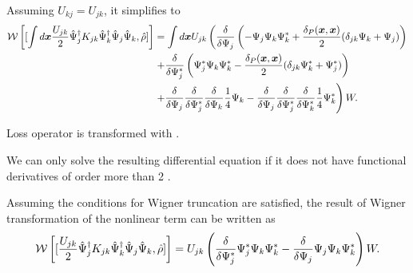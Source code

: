 Assuming $U_{kj} = U_{jk}$, it simplifies to
\begin{equation*}
\begin{split}
	\mathcal{W} \left[
		[
			\int d\boldsymbol{x} \frac{U_{jk}}{2}
				\hat{\Psi}_j^\dagger K_{jk} \hat{\Psi}_k^\dagger \hat{\Psi}_j \hat{\Psi}_k,
			\hat{\rho}
		]
	\right]
	& = \int d\boldsymbol{x} U_{jk} \left(
		\frac{\delta}{\delta \Psi_j} \left(
			- \Psi_j \Psi_k \Psi_k^*
			+ \frac{\delta_P(\boldsymbol{x}, \boldsymbol{x})}{2} ( \delta_{jk} \Psi_k + \Psi_j )
		\right) \right. \\
	&	\left. + \frac{\delta}{\delta \Psi_j^*} \left(
			\Psi_j^* \Psi_k \Psi_k^*
			- \frac{\delta_P(\boldsymbol{x}, \boldsymbol{x})}{2} ( \delta_{jk} \Psi_k^* + \Psi_j^* )
		\right) \right. \\
	&	\left.
			+ \frac{\delta}{\delta \Psi_j}
			\frac{\delta}{\delta \Psi_j^*}
			\frac{\delta}{\delta \Psi_k}
			\frac{1}{4} \Psi_k
			- \frac{\delta}{\delta \Psi_j}
			\frac{\delta}{\delta \Psi_j^*}
			\frac{\delta}{\delta \Psi_k^*}
			\frac{1}{4} \Psi_k^*
		\right) W.
\end{split}
\end{equation*}

Loss operator is transformed with .

We can only solve the resulting differential equation if it does not have functional derivatives of order more than 2 .

\begin{lemma}
Assuming the conditions for Wigner truncation are satisfied,
the result of Wigner transformation of the nonlinear term can be written as
\[
	\mathcal{W} \left[
		[
			\frac{U_{jk}}{2}
				\hat{\Psi}_j^\dagger K_{jk} \hat{\Psi}_k^\dagger \hat{\Psi}_j \hat{\Psi}_k,
			\hat{\rho}
		]
	\right]
	= U_{jk} \left(
		\frac{\delta}{\delta \Psi_j^*} \Psi_j^* \Psi_k \Psi_k^*
		- \frac{\delta}{\delta \Psi_j} \Psi_j \Psi_k \Psi_k^*
	\right) W.
\]
\end{lemma}

